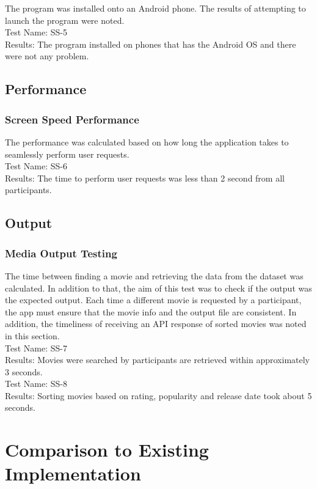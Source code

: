 \documentclass[12pt, titlepage]{article}
\begin{document}
The program was installed onto an Android phone. The results of attempting to launch the program were noted.\\

Test Name: SS-5\\
Results: The program installed on phones that has the Android OS and there were not any problem.
	
		
\subsection{Performance}
\subsubsection{Screen Speed Performance}
The performance was calculated based on how long the application takes to seamlessly perform user requests.\\

Test Name: SS-6 \\
Results: The time to perform user requests was less than 2 second from all participants.

\subsection{Output}
\subsubsection{Media Output Testing}

The time between finding a movie and retrieving the data from the dataset was calculated. In addition to that, the aim of this test was to check if the output was the expected output. Each time a different movie is requested by a participant, the app must ensure that the movie info and the output file are consistent. In addition, the timeliness of receiving an API response of sorted movies was noted in this section.\\ 

Test Name: SS-7 \\
Results: Movies were searched by participants are retrieved within approximately 3 seconds. \\

Test Name: SS-8 \\
Results: Sorting movies based on rating, popularity and release date took about 5 seconds.

	
\section{Comparison to Existing Implementation}	
\end{document}
